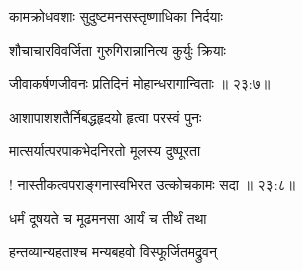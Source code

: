 \nemslokab

{\devanagarifont कामक्रोधवशाः सुदुष्टमनसस्तृष्णाधिका निर्दयाः  \danda\dontdisplaylinenum }%

\nemslokac

{\devanagarifont शौचाचारविवर्जिता गुरुगिरान्नानित्य कुर्युः क्रियाः }%
  \dontdisplaylinenum


\nemslokad

{\devanagarifont जीवाकर्षणजीवनः प्रतिदिनं मोहान्धरागान्विताः {॥ २३:७॥} \veg\dontdisplaylinenum }%

\ujvers{}

\nemslokab

{\devanagarifont आशापाशशतैर्निबद्धहृदयो हृत्वा परस्वं पुनः  \danda\dontdisplaylinenum }%

\nemslokac

{\devanagarifont मात्सर्यात्परपाकभेदनिरतो मूलस्य दुष्पूरता }%
  \dontdisplaylinenum    {}%



\nemslokad

{\devanagarifont ! नास्तीकत्वपराङ्गनास्वभिरत उत्कोचकामः सदा {॥ २३:८॥} \veg\dontdisplaylinenum }%

\ujvers{}

\nemslokab

{\devanagarifont धर्मं दूषयते च मूढमनसा आर्यं च तीर्थं तथा  \danda\dontdisplaylinenum }%
 
\nemslokac

{\devanagarifont हन्तव्यान्यहताश्च मन्यबहवो विस्फूर्जितमद्रुवन् }%
  \dontdisplaylinenum    {}%

